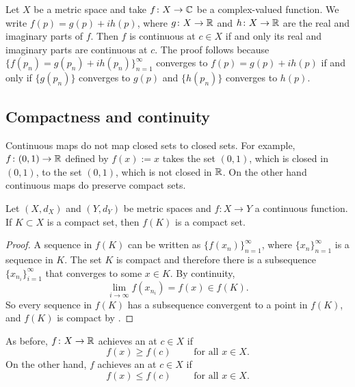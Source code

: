 \begin{example}
Let $X$ be a metric space and take $f \colon X \to {\mathbb{C}}$ be a complex-valued
function.  We write $f(p) = g(p) + i h(p)$, where $g \colon X \to {\mathbb{R}}$
and $h \colon X \to {\mathbb{R}}$ are the real and imaginary parts of $f$.
Then $f$ is continuous at $c \in X$ if and only its real
and imaginary parts are continuous at $c$.  
The proof follows because $\{ f(p_n) = g(p_n) + i h(p_n) \}_{n=1}^\infty$
converges to $f(p) = g(p) + i h(p)$ if and only if
$\{ g(p_n) \}$ converges to $g(p)$ and
$\{ h(p_n) \}$ converges to $h(p)$.
\end{example}

\subsection{Compactness and continuity}

Continuous maps do not map closed sets to closed sets.  For example,
$f \colon (0,1) \to {\mathbb{R}}$ defined by $f(x) := x$ takes the set $(0,1)$, which
is closed in $(0,1)$, to the set $(0,1)$, which is not closed in ${\mathbb{R}}$.
On the other hand continuous maps do preserve compact sets.

\begin{lemma} \label{lemma:continuouscompact}
Let $(X,d_X)$ and $(Y,d_Y)$ be metric spaces
and $f \colon X \to Y$ a continuous function.  If
$K \subset X$ is a compact set, then $f(K)$ is a compact set.
\end{lemma}

\begin{proof}
A sequence in $f(K)$ can be written as
$\{ f(x_n) \}_{n=1}^\infty$, where
$\{ x_n \}_{n=1}^\infty$ is a sequence in $K$.  The set $K$ is compact and
therefore there is a subsequence
$\{ x_{n_i} \}_{i=1}^\infty$ that converges to some $x \in K$.
By continuity,
\begin{equation*}
\lim_{i\to\infty} f(x_{n_i}) = f(x) \in f(K) .
\end{equation*}
So every sequence in $f(K)$ has a subsequence convergent to 
a point in $f(K)$, and $f(K)$ is compact by .
\end{proof}

As before, $f \colon X \to {\mathbb{R}}$ achieves an
\emph{} at $c \in X$ if
\begin{equation*}
f(x) \geq f(c) \qquad \text{ for all $x \in X$.}
\end{equation*}
On the other hand, $f$ achieves an 
\emph{} at $c \in X$ if
\begin{equation*}
f(x) \leq f(c) \qquad \text{ for all $x \in X$.}
\end{equation*}

